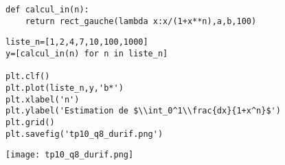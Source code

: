 \question{}




\question{} 

\begin{lstlisting}
def calcul_in(n):
    return rect_gauche(lambda x:x/(1+x**n),a,b,100)
\end{lstlisting}

\question{} 

\begin{minipage}{0.5\textwidth}
\begin{lstlisting}
liste_n=[1,2,4,7,10,100,1000]
y=[calcul_in(n) for n in liste_n]

plt.clf()
plt.plot(liste_n,y,'b*')
plt.xlabel('n')
plt.ylabel('Estimation de $\\int_0^1\\frac{dx}{1+x^n}$')
plt.grid()
plt.savefig('tp10_q8_durif.png')
\end{lstlisting}
\end{minipage}
\begin{minipage}{0.5\textwidth}
\texttt{[image: tp10\_q8\_durif.png]}
\end{minipage}